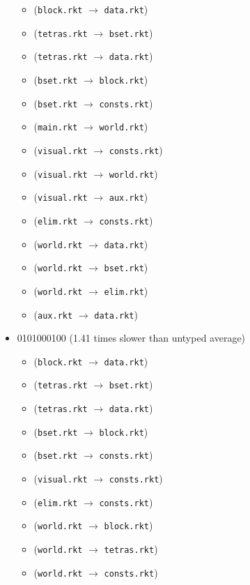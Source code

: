 \documentclass{article}
\newcommand{\mono}[1]{\texttt{#1}}
\begin{document}
\begin{itemize}
  \begin{itemize}
  \item (\mono{block.rkt} $\rightarrow$ \mono{data.rkt})
  \item (\mono{tetras.rkt} $\rightarrow$ \mono{bset.rkt})
  \item (\mono{tetras.rkt} $\rightarrow$ \mono{data.rkt})
  \item (\mono{bset.rkt} $\rightarrow$ \mono{block.rkt})
  \item (\mono{bset.rkt} $\rightarrow$ \mono{consts.rkt})
  \item (\mono{main.rkt} $\rightarrow$ \mono{world.rkt})
  \item (\mono{visual.rkt} $\rightarrow$ \mono{consts.rkt})
  \item (\mono{visual.rkt} $\rightarrow$ \mono{world.rkt})
  \item (\mono{visual.rkt} $\rightarrow$ \mono{aux.rkt})
  \item (\mono{elim.rkt} $\rightarrow$ \mono{consts.rkt})
  \item (\mono{world.rkt} $\rightarrow$ \mono{data.rkt})
  \item (\mono{world.rkt} $\rightarrow$ \mono{bset.rkt})
  \item (\mono{world.rkt} $\rightarrow$ \mono{elim.rkt})
  \item (\mono{aux.rkt} $\rightarrow$ \mono{data.rkt})
  \end{itemize}
\item 0101000100 (1.41 times slower than untyped average)
  \begin{itemize}
  \item (\mono{block.rkt} $\rightarrow$ \mono{data.rkt})
  \item (\mono{tetras.rkt} $\rightarrow$ \mono{bset.rkt})
  \item (\mono{tetras.rkt} $\rightarrow$ \mono{data.rkt})
  \item (\mono{bset.rkt} $\rightarrow$ \mono{block.rkt})
  \item (\mono{bset.rkt} $\rightarrow$ \mono{consts.rkt})
  \item (\mono{visual.rkt} $\rightarrow$ \mono{consts.rkt})
  \item (\mono{elim.rkt} $\rightarrow$ \mono{consts.rkt})
  \item (\mono{world.rkt} $\rightarrow$ \mono{block.rkt})
  \item (\mono{world.rkt} $\rightarrow$ \mono{tetras.rkt})
  \item (\mono{world.rkt} $\rightarrow$ \mono{consts.rkt})

\end{itemize}
\end{itemize}
\end{document}
